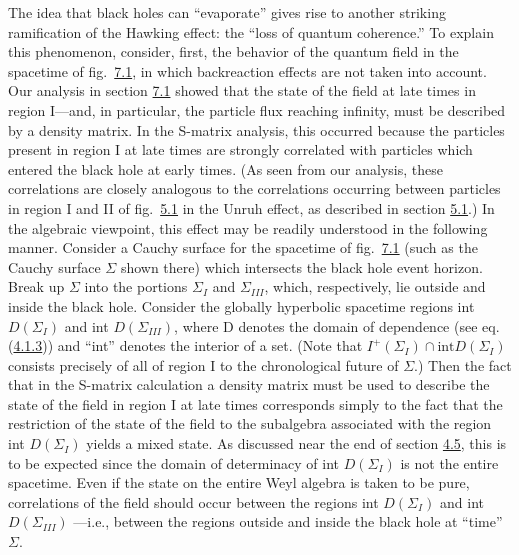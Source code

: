 \documentclass[11pt,a4paper]{article}
\begin{document}
The idea that black holes can ``evaporate'' gives rise to another striking ramification of the Hawking effect: the ``loss of quantum coherence.'' To explain this phenomenon, consider, first, the behavior of the quantum field in the spacetime of fig.~\hyperref[fig:7.1]{7.1}, in which backreaction\hypertarget{source-192}{} effects are not taken into account. Our analysis in section \hyperlink{sec:7.1}{7.1} showed that the state of the field at late times in region I---and, in particular, the particle flux reaching infinity, must be described by a density matrix. In the S-matrix analysis, this occurred because the particles present in region I at late times are strongly correlated with particles which entered the black hole at early times. (As seen from our analysis, these correlations are closely analogous to the correlations occurring between particles in region I and II of fig.~\hyperref[fig:5.1]{5.1} in the Unruh effect, as described in section \hyperlink{sec:5.1}{5.1}.) In the algebraic viewpoint, this effect may be readily understood in the following manner. Consider a Cauchy surface for the spacetime of fig.~\hyperref[fig:7.1]{7.1} (such as the Cauchy surface \(\Sigma\) shown there) which intersects the black hole event horizon. Break up \(\Sigma\) into the portions \(\Sigma_I\) and \(\Sigma_{III}\), which, respectively, lie outside and inside the black hole. Consider the globally hyperbolic spacetime regions int \(D(\Sigma_I)\) and int \(D(\Sigma_{III})\), where D denotes the domain of dependence (see eq. (\hyperref[eq:4.1.3]{4.1.3})) and ``int'' denotes the interior of a set. (Note that \(I^+(\Sigma_I) \cap \text{int} D(\Sigma_I)\) consists precisely of all of region I to the chronological future of \(\Sigma\).) Then the fact that in the S-matrix calculation a density matrix must be used to describe the state of the field in region I at late times corresponds simply to the fact that the restriction of the state of the field to the subalgebra associated with the region int \(D(\Sigma_I)\) yields a mixed state. As discussed near the end of section \hyperlink{sec:4.5}{4.5}, this is to be expected since the domain of determinacy of int \(D(\Sigma_I)\) is not the entire spacetime. Even if the state on the entire Weyl algebra is taken to be pure, correlations of the field should occur between the regions int \(D(\Sigma_I)\) and int \(D(\Sigma_{III})\) ---i.e., between the regions outside and inside the black hole at ``time'' \(\Sigma\).
\end{document}
